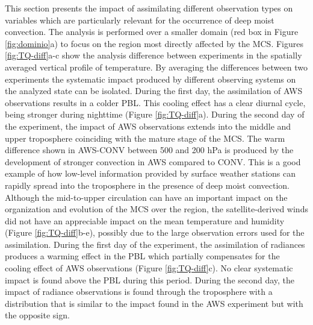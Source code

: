\documentclass[preprint, 3p, authoryear,review, 12pt]{elsarticle} %
\begin{document}
This section presents the impact of assimilating different observation types on variables which are particularly relevant for the occurrence of deep moist convection. The analysis is performed over a smaller domain (red box in Figure \ref{fig:dominio}a) to focus on the region most directly affected by the MCS. Figures \ref{fig:TQ-diff}a-c show the analysis difference between experiments in the spatially averaged vertical profile of temperature. By averaging the differences between two experiments the systematic impact produced by different observing systems on the analyzed state can be isolated. During the first day, the assimilation of AWS observations results in a colder PBL. This cooling effect has a clear diurnal cycle, being stronger during nighttime (Figure \ref{fig:TQ-diff}a). During the second day of the experiment, the impact of AWS observations extends into the middle and upper troposphere coinciding with the mature stage of the MCS. The warm difference shown in AWS-CONV between 500 and 200 hPa is produced by the development of stronger convection in AWS compared to CONV. This is a good example of how low-level information provided by surface weather stations can rapidly spread into the troposphere in the presence of deep moist convection. Although the mid-to-upper circulation can have an important impact on the organization and evolution of the MCS over the region, the satellite-derived winds did not have an appreciable impact on the mean temperature and humidity (Figure \ref{fig:TQ-diff}b-e), possibly due to the large observation errors used for the assimilation.
During the first day of the experiment, the assimilation of radiances produces a warming effect in the PBL which partially compensates for the cooling effect of AWS observations (Figure \ref{fig:TQ-diff}c). No clear systematic impact is found above the PBL during this period. During the second day, the impact of radiance observations is found through the troposphere with a distribution that is similar to the impact found in the AWS experiment but with the opposite sign.
\end{document}

